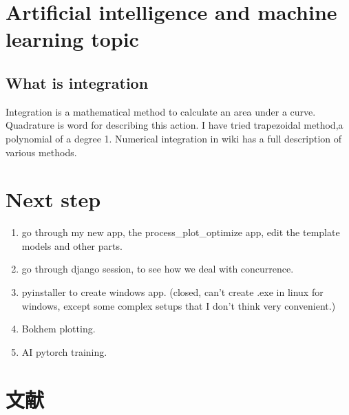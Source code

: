\documentclass[UTF8,fancyhdr,a4paper]{ctexart}
\begin{document}
\section{Artificial intelligence and machine learning topic}
\subsection{ What is integration}
Integration is a mathematical method to calculate an area under a curve. Quadrature is word for describing this action. I have tried trapezoidal method,a polynomial of a degree 1. Numerical integration in wiki has a full description of various methods.

\section{Next step}
\begin{enumerate}
      \item go through my new app, the process\_plot\_optimize app, edit the template models and other parts.
      \item go through django session, to see how we deal with concurrence.
      \item pyinstaller to create windows app. (closed, can't create .exe in linux for windows, except some complex setups that I don't think very convenient.)
      \item Bokhem plotting.
      \item AI pytorch training.
\end{enumerate}















\newpage
\section{文献}
\cite{10cm}


\end{document}
